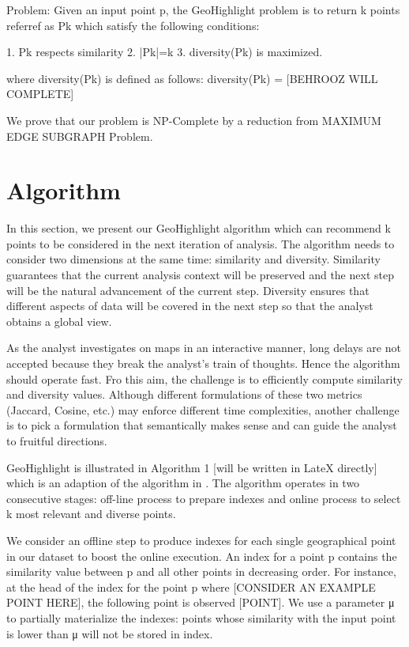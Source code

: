 \documentclass{sig-alternate-05-2015}
\begin{document}
Problem: Given an input point p, the GeoHighlight problem is to return k points referref as Pk which satisfy the following conditions:

1. Pk respects similarity
2. |Pk|=k
3. diversity(Pk) is maximized.

where diversity(Pk) is defined as follows: diversity(Pk) = [BEHROOZ WILL COMPLETE]

We prove that our problem is NP-Complete by a reduction from MAXIMUM EDGE SUBGRAPH Problem.

\section{Algorithm}\label{sec:algorithm}

In this section, we present our GeoHighlight algorithm which can recommend k points to be considered in the next iteration of analysis. The algorithm needs to consider two dimensions at the same time: similarity and diversity. Similarity guarantees that the current analysis context will be preserved and the next step will be the natural advancement of the current step. Diversity ensures that different aspects of data will be covered in the next step so that the analyst obtains a global view.

As the analyst investigates on maps in an interactive manner, long delays are not accepted because they break the analyst’s train of thoughts. Hence the algorithm should operate fast. Fro this aim, the challenge is to efficiently compute similarity and diversity values. Although different formulations of these two metrics (Jaccard, Cosine, etc.) may enforce different time complexities, another challenge is to pick a formulation that semantically makes sense and can guide the analyst to fruitful directions.

GeoHighlight is illustrated in Algorithm 1 [will be written in LateX directly] which is an adaption of the algorithm in \cite{Omidvar-Tehrani:2015}. The algorithm operates in two consecutive stages: off-line process to prepare indexes and online process to select k most relevant and diverse points.

We consider an offline step to produce indexes for each single geographical point in our dataset to boost the online execution. An index for a point p contains the similarity value between p and all other points in decreasing order. For instance, at the head of the index for the point p where [CONSIDER AN EXAMPLE POINT HERE], the following point is observed [POINT]. We use a parameter μ to partially materialize the indexes: points whose similarity with the input point is lower than μ will not be stored in index.
\end{document}
